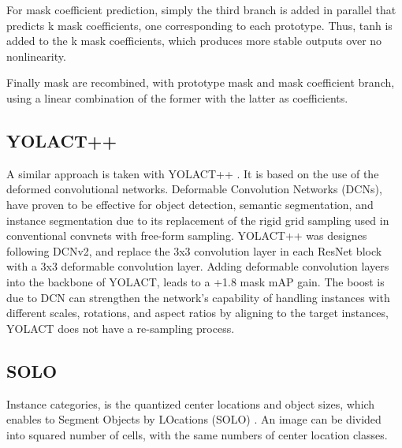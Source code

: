 For mask coefficient prediction, simply the third branch is added in parallel that predicts k mask coefficients, one corresponding to each prototype. Thus, tanh is added
to the k mask coefficients, which produces more stable outputs over no nonlinearity.

Finally mask are recombined, with prototype mask and mask coefficient branch, using a linear combination of the former with the latter as coefficients.

\subsection{YOLACT++}

A similar approach is taken with YOLACT++ \cite{2020}. It is based on the use of the deformed convolutional networks.
Deformable Convolution Networks (DCNs)\cite{dai2017deformable}, \cite{zhu2019deformable} have proven to be effective for object detection, semantic segmentation, and
instance segmentation due to its replacement of the rigid grid sampling used in conventional convnets with free-form sampling.
YOLACT++ was designes following DCNv2, and replace the 3x3 convolution layer in each ResNet block with a 3x3 deformable convolution layer.
Adding deformable convolution layers into the backbone of YOLACT, leads to a +1.8 mask mAP gain. The boost is due to DCN can strengthen the network’s capability of
handling instances with different scales, rotations, and aspect ratios by aligning to the target instances, YOLACT does not have a re-sampling process.
 
\subsection{SOLO}
Instance categories, is the quantized center locations and object sizes, which enables to Segment Objects by LOcations (SOLO) \cite{wang2020solov2}. An image can be
divided into squared number of cells, with the same numbers of center location classes. 












